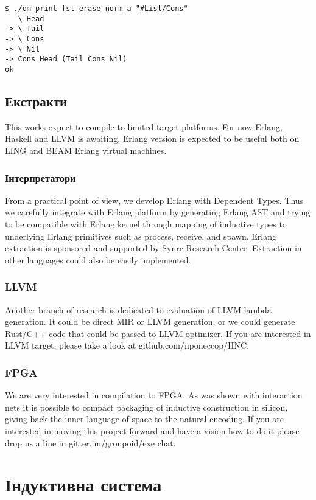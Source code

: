 \begin{definition}
\begin{definition}
\begin{definition}
\begin{definition}
\begin{lstlisting}
$ ./om print fst erase norm a "#List/Cons"
   \ Head
-> \ Tail
-> \ Cons
-> \ Nil
-> Cons Head (Tail Cons Nil)
ok
\end{lstlisting}

\subsection{Екстракти}

This works expect to compile to limited target platforms. For now Erlang, Haskell and LLVM is awaiting.
Erlang version is expected to be useful both on LING and BEAM Erlang virtual machines.

\subsubsection{Інтерпретатори}

From a practical point of view, we develop Erlang with Dependent Types.
Thus we carefully integrate with Erlang platform by generating Erlang
AST and trying to be compatible with Erlang kernel through mapping of
inductive types to underlying Erlang primitives such as process,
receive, and spawn. Erlang extraction is sponsored and supported
by Synrc Research Center. Extraction in other languages could also be easily implemented.

\subsubsection{LLVM}

Another branch of research is dedicated to evaluation of LLVM lambda generation. It could be direct MIR or LLVM generation, or we could generate Rust/C++ code that could be passed to LLVM optimizer. If you are interested in LLVM target, please take a look at github.com/nponeccop/HNC.

\subsubsection{FPGA}

We are very interested in compilation to FPGA. As was shown with interaction nets it is possible to compact packaging of inductive construction in silicon, giving back the inner language of space to the natural encoding. If you are interested in moving this project forward and have a vision how to do it please drop us a line in gitter.im/groupoid/exe chat.

\newpage
\section{Індуктивна система}


\end{definition}
\end{definition}
\end{definition}
\end{definition}
